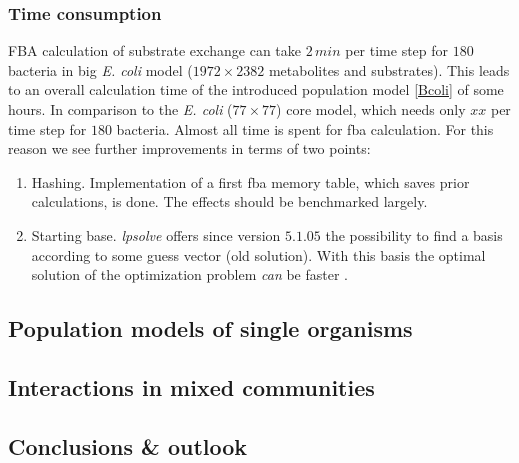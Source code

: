 \subsubsection{Time consumption}
FBA calculation of substrate exchange can take $2\,min$ per time step for $180$ bacteria in big \textit{E. coli} model ($1972\times 2382$ metabolites and substrates).
This leads to an overall calculation time of the introduced population model \ref{Bcoli} of some hours.
In comparison to the \textit{E. coli} ($77\times 77$) core model, which needs only $xx$ per time step for $180$ bacteria.
Almost all time is spent for fba calculation.
For this reason we see further improvements in terms of two points:
\begin{enumerate}
  \item Hashing. Implementation of a first fba memory table, which saves prior calculations, is done.
    The effects should be benchmarked largely.
  \item Starting base. \textit{lpsolve} offers since version $5.1.05$ the possibility to find a basis according to some guess vector (old solution).
    With this basis the optimal solution of the optimization problem \textit{can} be faster \cite{warmstart}.
\end{enumerate}




\subsection{Population models of single organisms}

\subsection{Interactions in mixed communities}
\subsection{Conclusions \& outlook}
